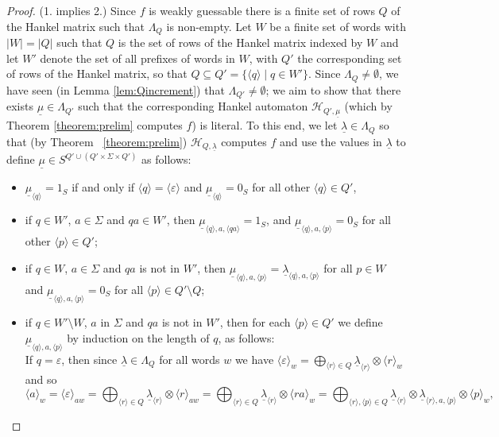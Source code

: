 \documentclass{lmcs}
\numberwithin{theorem}{section}
\begin{document}
\begin{proof}
	(1. implies 2.) Since $f$ is weakly guessable there is a finite set of rows $Q$ of the Hankel matrix such that $\Lambda_Q$ is non-empty. Let $W$ be a finite set of words with $|W|=|Q|$ such that $Q$ is the set of rows of the Hankel matrix indexed by $W$ and let $W'$ denote the set of all prefixes of words in $W$,  with $Q'$ the corresponding set of rows of the Hankel matrix, so that $Q \subseteq Q' = \{\langle q \rangle \mid q \in W'\}$. Since $\Lambda_Q \neq \emptyset$, we have seen (in Lemma \ref{lem:Qincrement}) that $\Lambda_{Q'} \neq \emptyset$; we aim to show that there exists $\underline{\mu} \in \Lambda_{Q'}$ such that the corresponding Hankel automaton $\mathcal{H}_{Q', \underline{\mu}}$ (which by Theorem \ref{theorem:prelim} computes $f$) is literal. To this end, we  let $\underline{\lambda} \in \Lambda_Q$ so that (by Theorem ~\ref{theorem:prelim}) $\mathcal{H}_{Q,\underline{\lambda}}$ computes $f$ and use the values in $\underline{\lambda}$ to define $\underline{\mu} \in S^{Q' \cup (Q' \times \Sigma \times Q')}$ as follows:
	\begin{itemize}
		\item $\underline{\mu}_{\langle q \rangle} = 1_S$ if and only if $\langle q \rangle =\langle \varepsilon \rangle$ and $\underline{\mu}_{\langle q \rangle} = 0_S$ for all other  $\langle q \rangle  \in Q'$,
		\item if $q \in W'$, $a \in \Sigma$ and $qa \in W'$, then $\underline{\mu}_{\langle q \rangle, a ,\langle qa\rangle} = 1_S$, and $\underline{\mu}_{\langle q \rangle,a,\langle p\rangle} = 0_S$ for all other $\langle p \rangle \in Q'$;
		\item if $q  \in W$, $a \in \Sigma$ and $qa$ is not in $W'$, then $\underline{\mu}_{\langle q \rangle ,a, \langle p\rangle } = \underline{\lambda}_{\langle q \rangle ,a,\langle p\rangle }$ for all $p \in W$ and $\underline{\mu}_{\langle q \rangle ,a,\langle p\rangle} = 0_S$ for all $\langle p \rangle \in Q' \setminus Q$;
		\item if $q \in W' \setminus W$, $a$ in $\Sigma$ and $qa$ is not in $W'$, then for each $\langle p \rangle \in Q'$ we define $\underline{\mu}_{\langle q \rangle ,a,\langle p \rangle}$ by induction on the length of $q$, as follows:\\
		If $q = \varepsilon$, then since $\underline{\lambda} \in \Lambda_Q$ for all words $w$ we have $\langle \varepsilon \rangle_w = \bigoplus_{\langle r \rangle \in Q} \underline{\lambda}_{\langle r \rangle} \otimes \langle r \rangle_w$ and so \[\langle a \rangle_w = \langle \varepsilon \rangle_{aw} =  \bigoplus_{\langle r \rangle \in Q} \underline{\lambda}_{\langle r \rangle} \otimes \langle r \rangle_{aw} =  \bigoplus_{\langle r \rangle \in Q} \underline{\lambda}_{\langle r \rangle} \otimes \langle ra \rangle_w =  \bigoplus_{\langle r \rangle, \langle p \rangle  \in Q} \underline{\lambda}_{\langle r \rangle} \otimes \underline{\lambda}_{\langle r \rangle ,a, \langle p \rangle} \otimes \langle p \rangle_w,\]

\end{itemize}
\end{proof}
\end{document}
